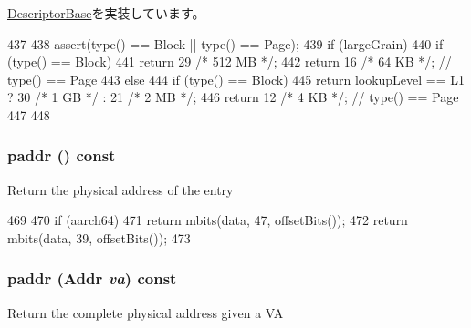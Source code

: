 \hyperlink{classArmISA_1_1TableWalker_1_1DescriptorBase_a21735b91214af921462c578b766a01ae}{DescriptorBase}を実装しています。


\begin{DoxyCode}
437         {
438             assert(type() == Block || type() == Page);
439             if (largeGrain) {
440                 if (type() == Block)
441                     return 29 /* 512 MB */;
442                 return 16 /* 64 KB */;  // type() == Page
443             } else {
444                 if (type() == Block)
445                     return lookupLevel == L1 ? 30 /* 1 GB */ : 21 /* 2 MB */;
446                 return 12 /* 4 KB */;  // type() == Page
447             }
448         }
\end{DoxyCode}
\hypertarget{classArmISA_1_1TableWalker_1_1LongDescriptor_a26f24be1556c1c0ac2c42e1eff5e1197}{
\subsubsection[{paddr}]{ paddr () const}}
\label{classArmISA_1_1TableWalker_1_1LongDescriptor_a26f24be1556c1c0ac2c42e1eff5e1197}
Return the physical address of the entry 


\begin{DoxyCode}
469         {
470             if (aarch64)
471                 return mbits(data, 47, offsetBits());
472             return mbits(data, 39, offsetBits());
473         }
\end{DoxyCode}
\hypertarget{classArmISA_1_1TableWalker_1_1LongDescriptor_a4fd8dbd54f4412ba92edbf632940c8de}{
\subsubsection[{paddr}]{ paddr ({\bf Addr} {\em va}) const}}
\label{classArmISA_1_1TableWalker_1_1LongDescriptor_a4fd8dbd54f4412ba92edbf632940c8de}
Return the complete physical address given a VA 


